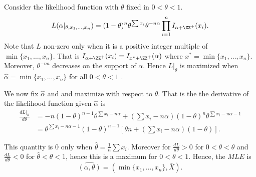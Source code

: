 \documentclass{stat_homework}
\begin{document}
Consider the likelihood function with $\theta$ fixed in $0<\theta<1$.
$$
  L(\alpha|_{\theta,x_1,\dots,x_n}) = (1-\theta)^n \theta^{\sum x_i} \theta^{ - n\alpha}\prod_{i=1}^n I_{\alpha + \ZZ^+}(x_i).
$$
Note that $L$ non-zero only when it is a positive integer multiple of $\min\{x_1,\dots,x_n\}$.  That is $I_{\alpha + \ZZ^+} (x_i) = I_{x^* + \ZZ^+}(\alpha)$ where $x^* = \min\{x_1,\dots,x_n\}$. Moreover, $\theta^{-na}$ decreases on the support of $\alpha$.  Hence $L|_{\theta}$ is maximized when $\hat \alpha = \min\{x_1,\dots,x_n\}$ for all $0<\theta<1$ .

We now fix $\hat \alpha$ and and maximize with respect to $\theta$.  
That is the the derivative of the likelihood function given $\hat \alpha$ is
\begin{align*}
  \frac{dL|_{\hat \alpha}}{d\theta} &= -n(1-\theta)^{n-1} \theta^{\sum x_i - n\alpha} + \left(\sum x_i -n\alpha\right)(1-\theta)^n \theta^{\sum x_i -n\alpha -1}\\
  &= \theta^{\sum x_i -n\alpha -1}(1-\theta)^{n-1}\left[\theta n +\left(\sum x_i -n\alpha\right) (1-\theta)\right].
\end{align*}

This quantity is $0$ only when $\hat \theta = \frac1n \sum x_i$.  Moreover for $\frac{dL}{d\theta} > 0$ for $0<\theta < \hat \theta$ and $\frac{dL}{d\theta} < 0$ for $\hat\theta< \theta <1$, hence this is a maximum for $0<\theta<1$.  Hence, the $MLE$ is
$$
\hat{(\alpha,\theta)} = \left(\min\{x_1,\dots,x_n\},\bar X\right).
$$ 
\end{document}
